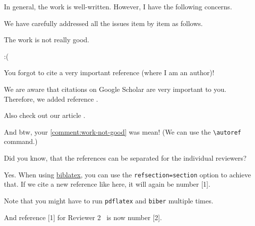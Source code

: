 \documentclass[12pt,english]{scrartcl}
\begin{document}
\reviewer
\begin{generalcomment}
	In general, the work is well-written. However, I have the following concerns.
\end{generalcomment}
\begin{revresponse}
	We have carefully addressed all the issues item by item as follows.
\end{revresponse}

\begin{revcomment}\label{comment:work-not-good}
	The work is not really good.
\end{revcomment}
\begin{revresponse}
	:(
\end{revresponse}

\begin{revcomment}
	You forgot to cite a very important reference (where I am an author)!
\end{revcomment}
\begin{revresponse}
	We are aware that citations on Google Scholar are very important to you.
	Therefore, we added reference \cite{ReviewerReference}.
	
	Also check out our article \cite{Besser2020}.
	
	
	And btw, your \autoref{comment:work-not-good} was mean! (We can use the \verb|\autoref| command.)
\end{revresponse}


\reviewer
\begin{revcomment}
	Did you know, that the references can be separated for the individual reviewers?
\end{revcomment}
\begin{revresponse}
	Yes. When using \href{https://www.ctan.org/pkg/biblatex}{biblatex}, you can use the \texttt{refsection=section} option to achieve that.
	If we cite a new reference like \cite{Besser2021} here, it will again be number [1].
	
	Note that you might have to run \texttt{pdflatex} and \texttt{biber} multiple times.
	
	And reference [1] for Reviewer 2~\cite{ReviewerReference} is now number [2].
	
\end{revresponse}
\end{document}
